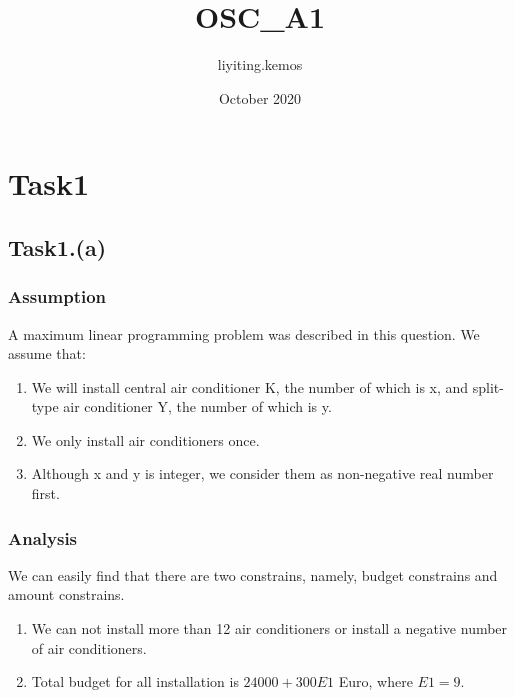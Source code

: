 \documentclass{article}
\title{OSC_A1}
\author{liyiting.kemos }
\date{October 2020}
\begin{document}
\section{Task1}
    \subsection{Task1.(a)}
        \subsubsection{Assumption}
            A maximum linear programming problem was described in this question. We assume that:\\
            \begin{enumerate}
                \item We will install central air conditioner K, the number of which is x, and split-type air conditioner Y, the number of which is y. 
                \item We only install air conditioners once.
                \item Although x and y is integer, we consider them as non-negative real number first.
            \end{enumerate}
    
        \subsubsection{Analysis}
            We can easily find that there are two constrains, namely, budget constrains and amount constrains. \\
            \begin{enumerate}
                \item We can not install more than 12 air conditioners or install a negative number of air conditioners. 
                \item Total budget for all installation is $24000 + 300E1$ Euro, where $E1 = 9$.
            \end{enumerate}
            
\end{document}
